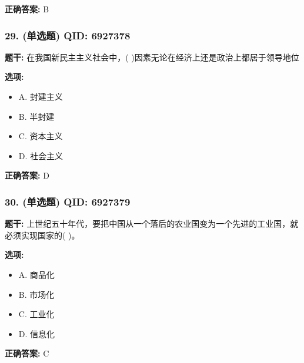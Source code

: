 \documentclass[12pt,UTF8]{ctexart}
\begin{document}
\textbf{正确答案:}
B

\vspace{0.3em}\hrulefill\vspace{0.7em}

\subsubsection*{29. (单选题) \small QID: 6927378}

\textbf{题干:}
在我国新民主主义社会中，(         )因素无论在经济上还是政治上都居于领导地位

\textbf{选项:}
\begin{itemize}[leftmargin=*]

  \item A. 封建主义

  \item B. 半封建

  \item C. 资本主义

  \item D. 社会主义

\end{itemize}

\textbf{正确答案:}
D

\vspace{0.3em}\hrulefill\vspace{0.7em}

\subsubsection*{30. (单选题) \small QID: 6927379}

\textbf{题干:}
上世纪五十年代，要把中国从一个落后的农业国变为一个先进的工业国，就必须实现国家的(       )。

\textbf{选项:}
\begin{itemize}[leftmargin=*]

  \item A. 商品化

  \item B. 市场化

  \item C. 工业化

  \item D. 信息化

\end{itemize}

\textbf{正确答案:}
C

\vspace{0.3em}\hrulefill\vspace{0.7em}
\end{document}
